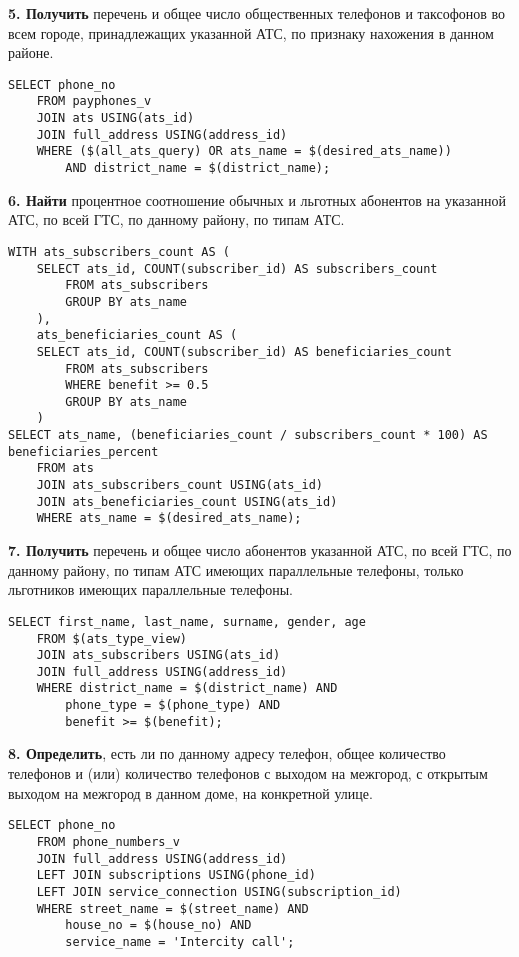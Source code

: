 \documentclass{report}
\begin{document}
\textbf{5. Получить} перечень и общее число общественных телефонов и 
таксофонов во всем городе, принадлежащих указанной АТС, по признаку 
нахожения в данном районе.

\begin{lstlisting}
SELECT phone_no
    FROM payphones_v
    JOIN ats USING(ats_id)
    JOIN full_address USING(address_id)
    WHERE ($(all_ats_query) OR ats_name = $(desired_ats_name))
        AND district_name = $(district_name);
\end{lstlisting}

\textbf{6. Найти} процентное соотношение обычных и льготных абонентов 
на указанной АТС, по всей ГТС, по данному району, по типам АТС.

\begin{lstlisting}
WITH ats_subscribers_count AS (
    SELECT ats_id, COUNT(subscriber_id) AS subscribers_count  
        FROM ats_subscribers
        GROUP BY ats_name
    ),
    ats_beneficiaries_count AS (
    SELECT ats_id, COUNT(subscriber_id) AS beneficiaries_count  
        FROM ats_subscribers
        WHERE benefit >= 0.5
        GROUP BY ats_name
    )
SELECT ats_name, (beneficiaries_count / subscribers_count * 100) AS beneficiaries_percent
    FROM ats
    JOIN ats_subscribers_count USING(ats_id)
    JOIN ats_beneficiaries_count USING(ats_id)
    WHERE ats_name = $(desired_ats_name);
\end{lstlisting}

\textbf{7. Получить} перечень и общее число абонентов указанной АТС, 
по всей ГТС, по данному району, по типам АТС имеющих параллельные телефоны, 
только льготников имеющих параллельные телефоны.

\begin{lstlisting}
SELECT first_name, last_name, surname, gender, age
    FROM $(ats_type_view) 
    JOIN ats_subscribers USING(ats_id)
    JOIN full_address USING(address_id)
    WHERE district_name = $(district_name) AND
        phone_type = $(phone_type) AND
        benefit >= $(benefit);
\end{lstlisting}

\textbf{8. Определить}, есть ли по данному адресу телефон, общее 
количество телефонов и (или) количество телефонов с выходом на межгород, 
с открытым выходом на межгород в данном доме, на конкретной улице.

\begin{lstlisting}
SELECT phone_no
    FROM phone_numbers_v
    JOIN full_address USING(address_id)
    LEFT JOIN subscriptions USING(phone_id)
    LEFT JOIN service_connection USING(subscription_id)
    WHERE street_name = $(street_name) AND
        house_no = $(house_no) AND
        service_name = 'Intercity call';
\end{lstlisting}
\end{document}
